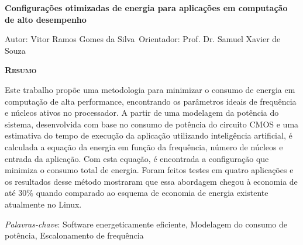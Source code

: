 \begin{center}
	{\Large{\textbf{Configurações otimizadas de energia para aplicações em computação de alto desempenho}}}
\end{center}

\vspace{1cm}

\begin{flushright}
	Autor: Vitor Ramos Gomes da Silva\
	Orientador: Prof. Dr. Samuel Xavier de Souza
\end{flushright}

\vspace{1cm}

\begin{center}
	\Large{\textsc{\textbf{Resumo}}}
\end{center}

\noindent 
Este trabalho propõe uma metodologia para minimizar o consumo de energia 
em computação de alta performance, encontrando os parâmetros ideais de frequência e núcleos ativos no processador. A partir de uma modelagem da potência do sistema, desenvolvida com base no consumo de potência do circuito CMOS e uma estimativa do tempo de execução da aplicação utilizando inteligência artificial, é calculada a equação da energia em função da frequência, número de núcleos e entrada da aplicação. Com esta equação, é encontrada a configuração que minimiza o consumo total de energia. Foram feitos testes em quatro aplicações e os resultados desse método mostraram que essa abordagem chegou à economia de até 30\% quando comparado ao esquema de economia de energia existente atualmente no Linux.


\noindent\textit{Palavras-chave}: Software energeticamente eficiente, Modelagem do consumo de potência, Escalonamento de frequência